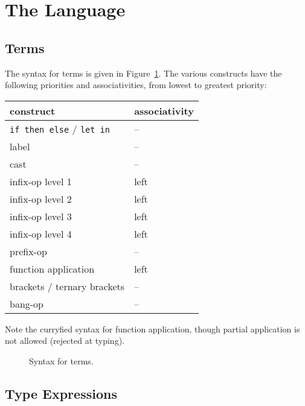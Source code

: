 
\section{The \why Language}

\subsection{Terms}

The syntax for terms is given in Figure~\ref{fig:bnf:term}.
The various constructs have the following priorities and
associativities, from lowest to greatest priority:
\begin{center}
  \begin{tabular}{|l|l|}
    \hline
    construct & associativity \\
    \hline\hline
    \texttt{if then else} / \texttt{let in} & -- \\
    label & -- \\
    cast  & -- \\
    infix-op level 1 & left \\
    infix-op level 2 & left \\
    infix-op level 3 & left \\
    infix-op level 4 & left \\
    prefix-op     & --   \\
    function application & left \\
    brackets / ternary brackets & -- \\
    bang-op       & --   \\
    \hline
  \end{tabular}
\end{center}

Note the curryfied syntax for function application, though partial
application is not allowed (rejected at typing).

\begin{figure}
  \begin{center}\framebox{}\end{center}
  \caption{Syntax for terms.}
\label{fig:bnf:term}
\end{figure}

\subsection{Type Expressions}


